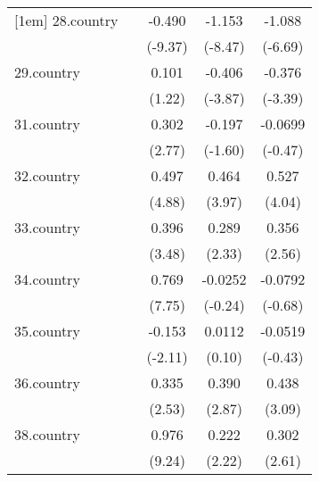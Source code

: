 {\begin{tabular}{l*{4}{c}}
[1em]
28.country  &                     &      -0.490\sym{***}&      -1.153\sym{***}&      -1.088\sym{***}\\
            &                     &     (-9.37)         &     (-8.47)         &     (-6.69)         \\
[1em]
29.country  &                     &       0.101         &      -0.406\sym{***}&      -0.376\sym{***}\\
            &                     &      (1.22)         &     (-3.87)         &     (-3.39)         \\
[1em]
31.country  &                     &       0.302\sym{**} &      -0.197         &     -0.0699         \\
            &                     &      (2.77)         &     (-1.60)         &     (-0.47)         \\
[1em]
32.country  &                     &       0.497\sym{***}&       0.464\sym{***}&       0.527\sym{***}\\
            &                     &      (4.88)         &      (3.97)         &      (4.04)         \\
[1em]
33.country  &                     &       0.396\sym{***}&       0.289\sym{*}  &       0.356\sym{*}  \\
            &                     &      (3.48)         &      (2.33)         &      (2.56)         \\
[1em]
34.country  &                     &       0.769\sym{***}&     -0.0252         &     -0.0792         \\
            &                     &      (7.75)         &     (-0.24)         &     (-0.68)         \\
[1em]
35.country  &                     &      -0.153\sym{*}  &      0.0112         &     -0.0519         \\
            &                     &     (-2.11)         &      (0.10)         &     (-0.43)         \\
[1em]
36.country  &                     &       0.335\sym{*}  &       0.390\sym{**} &       0.438\sym{**} \\
            &                     &      (2.53)         &      (2.87)         &      (3.09)         \\
[1em]
38.country  &                     &       0.976\sym{***}&       0.222\sym{*}  &       0.302\sym{**} \\
            &                     &      (9.24)         &      (2.22)         &      (2.61)         \\

\end{tabular}}
